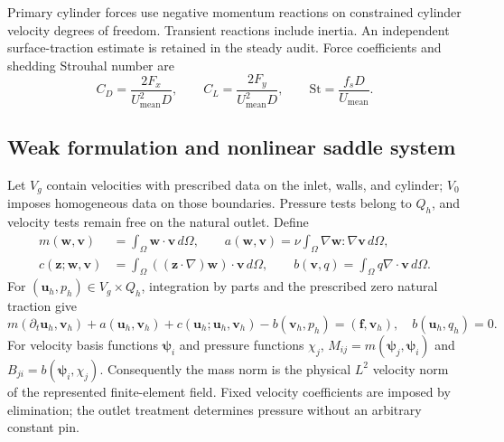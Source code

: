 \documentclass[11pt,a4paper]{article}
\begin{document}
Primary cylinder forces use negative momentum reactions on constrained cylinder velocity degrees of freedom. Transient reactions include inertia. An independent surface-traction estimate is retained in the steady audit. Force coefficients and shedding Strouhal number are
\begin{equation}
 C_D=\frac{2F_x}{U_{\mathrm{mean}}^2D},\qquad
 C_L=\frac{2F_y}{U_{\mathrm{mean}}^2D},\qquad
 \mathrm{St}=\frac{f_sD}{U_{\mathrm{mean}}}.\label{eq:forces}
\end{equation}

\subsection{Weak formulation and nonlinear saddle system}
Let $V_g$ contain velocities with prescribed data on the inlet, walls, and cylinder; $V_0$ imposes homogeneous data on those boundaries. Pressure tests belong to $Q_h$, and velocity tests remain free on the natural outlet. Define
\begin{align}
 m(\bm w,\bm v)&=\int_\Omega\bm w\cdot\bm v\,d\Omega,\qquad
 a(\bm w,\bm v)=\nu\int_\Omega\nabla\bm w:\nabla\bm v\,d\Omega,\\
 c(\bm z;\bm w,\bm v)&=\int_\Omega ((\bm z\cdot\nabla)\bm w)\cdot\bm v\,d\Omega,\qquad
 b(\bm v,q)=\int_\Omega q\nabla\cdot\bm v\,d\Omega.
\end{align}
For $(\bm u_h,p_h)\in V_g\times Q_h$, integration by parts and the prescribed zero natural traction give
\begin{equation}
 m(\partial_t\bm u_h,\bm v_h)+a(\bm u_h,\bm v_h)
 +c(\bm u_h;\bm u_h,\bm v_h)-b(\bm v_h,p_h)
 =(\bm f,\bm v_h),\quad b(\bm u_h,q_h)=0.\label{eq:weakform}
\end{equation}
For velocity basis functions $\bm\psi_i$ and pressure functions $\chi_j$, $M_{ij}=m(\bm\psi_j,\bm\psi_i)$ and $B_{ji}=b(\bm\psi_i,\chi_j)$. Consequently the mass norm is the physical $L^2$ velocity norm of the represented finite-element field. Fixed velocity coefficients are imposed by elimination; the outlet treatment determines pressure without an arbitrary constant pin.
\end{document}
